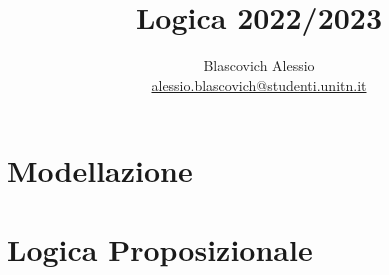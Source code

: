 \documentclass{book}
\title{Logica 2022/2023}
\author{Blascovich Alessio\\
    \href{mailto:alessio.blascovich@studenti.unitn.it}{alessio.blascovich@studenti.unitn.it}}
\date{}
\begin{document}
    \maketitle
    \tableofcontents
    \part{Modellazione}
    

    \part{Logica Proposizionale}
    
\end{document}
